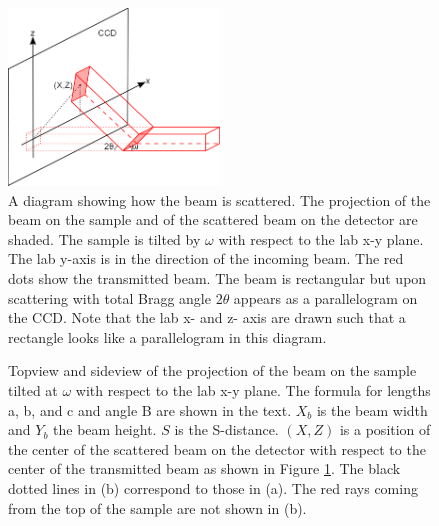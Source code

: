 \documentclass[letterpaper,12pt]{article}
\begin{document}
\begin{figure}
	\centering
	\includegraphics[width=0.5\textwidth]{GeometricBroadening1}
	\caption{A diagram showing how the beam is scattered. The projection of the beam on the sample and of the scattered beam on the detector are shaded. The sample is tilted by $\omega$ with respect to the lab x-y plane. The lab y-axis is in the direction of the incoming beam. The red dots show the transmitted beam. The beam is rectangular but upon scattering with total Bragg angle $2\theta$ appears as a parallelogram on the CCD. Note that the lab x- and z- axis are drawn such that a rectangle looks like a parallelogram in this diagram.}
	\label{fig:GeometricBroadening1}
\end{figure}
\begin{figure}
	\centering
	\caption{Topview and sideview of the projection of the beam on the sample tilted at $\omega$ with respect to the lab x-y plane. The formula for lengths a, b, and c and angle B are shown in the text. $X_b$ is the beam width and $Y_b$ the beam height. $S$ is the S-distance. $(X,Z)$ is a position of the center of the scattered beam on the detector with respect to the center of the transmitted beam as shown in Figure \ref{fig:GeometricBroadening1}. The black dotted lines in (b) correspond to those in (a). The red rays coming from the top of the sample are not shown in (b).}
	\label{fig:GeometricBroadening2}
\end{figure}
\end{document}
